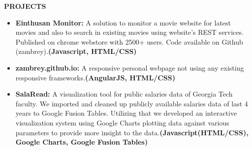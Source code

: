 \documentclass[a4paper]{article}
\newcommand{\resumesection}[1]{
	\vspace*{-0.5\baselineskip}
	\begin{flushleft}
		\large{\textbf{\uppercase{#1}}}
	\end{flushleft}
} %
\newcommand{\project}[3]{\item \textbf{#1:} #2\textbf{(#3)}} %
\begin{document}
\resumesection{Projects}
\begin{itemize}
	\project{Einthusan Monitor}{A solution to monitor a movie website for latest movies and also to search in existing movies using website's REST services. Published on chrome webstore with 2500+ users. Code available on Github (zambrey).}{Javascript, HTML/CSS}
	\project{zambrey.github.io}{A responsive personal webpage not using any existing responsive frameworks.}{AngularJS, HTML/CSS}
	\project{SalaRead}{A visualization tool for public salaries data of Georgia Tech faculty. We imported and cleaned up publicly available salaries data of last 4 years to Google Fusion Tables. Utilizing that we developed an interactive visualization system using Google Charts plotting data against various parameters to provide more insight to the data.}{Javascript(HTML/CSS), Google Charts, Google Fusion Tables}
\end{itemize}
\end{document}
